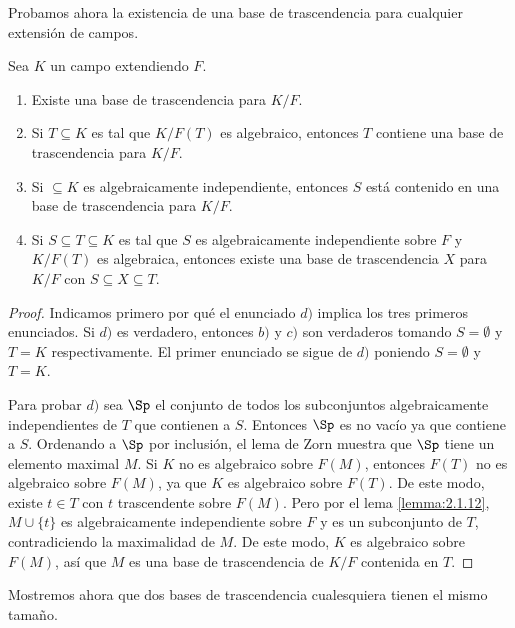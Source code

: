Probamos ahora la existencia de una base de trascendencia para cualquier extensión de campos.

\begin{theorem}\label{theo:2.1.13}
  Sea $K$ un campo extendiendo $F$.
  \begin{enumerate}
    \item Existe una base de trascendencia para $K/F$.
    \item Si $T \subseteq K$ es tal que $K/F(T)$ es algebraico, entonces $T$ contiene una base de trascendencia para $K/F$.
    \item Si $\subseteq K$ es algebraicamente independiente, entonces $S$ está contenido en una base de trascendencia para $K/F$.
    \item Si $S \subseteq T \subseteq K$ es tal que $S$ es algebraicamente independiente sobre $F$ y $K/F(T)$ es algebraica, entonces existe una base de trascendencia $X$ para $K/F$ con $S \subseteq X \subseteq T$.
  \end{enumerate}
\end{theorem}
\begin{proof}
  Indicamos primero por qué el enunciado $d)$ implica los tres primeros enunciados. Si $d)$ es verdadero, entonces $b)$ y $c)$ son verdaderos tomando $S = \emptyset$ y $T = K$ respectivamente. El primer enunciado se sigue de $d)$ poniendo $S = \emptyset$ y $T = K$.

  Para probar $d)$ sea $\Sp$ el conjunto de todos los subconjuntos algebraicamente independientes de $T$ que contienen a $S$. Entonces $\Sp$ es no vacío ya que contiene a $S$. Ordenando a $\Sp$ por inclusión, el lema de Zorn muestra que $\Sp$ tiene un elemento maximal $M$. Si $K$ no es algebraico sobre $F(M)$, entonces $F(T)$ no es algebraico sobre $F(M)$, ya que $K$ es algebraico sobre $F(T)$. De este modo, existe $t \in T$ con $t$ trascendente sobre $F(M)$. Pero por el lema \ref{lemma:2.1.12}, $M \cup \{t\}$ es algebraicamente independiente sobre $F$ y es un subconjunto de $T$, contradiciendo la maximalidad de $M$. De este modo, $K$ es algebraico sobre $F(M)$, así que $M$ es una base de trascendencia de $K/F$ contenida en $T$.
\end{proof}

Mostremos ahora que dos bases de trascendencia cualesquiera tienen el mismo tamaño.


